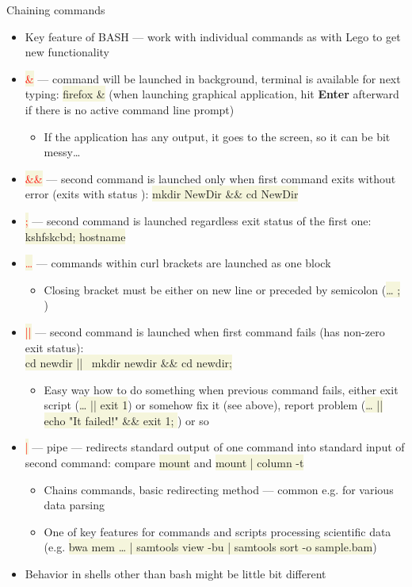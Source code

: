\documentclass[compress, ucs, xelatex, 11pt, xcolor=svgnames, aspectratio=169,
	hyperref={
		bookmarks=true,
		unicode=true,
		colorlinks=true,
		pdftitle={Linux, command line and MetaCentrum},
		plainpages=false,
		pdfauthor={Vojtech Zeisek},
		pdfsubject={Course about use of Linux command line, writing shell scripts and using MetaCentrum of CESNET},
		pdfcreator={XeLaTeX},
		pdfkeywords={Linux, GNU, BASH, shell, command line, MetaCentrum},
		linkcolor=DarkRed, %
		anchorcolor=DarkBlue, %
		citecolor=Indigo, %
		filecolor=NavyBlue, %
		menucolor=DarkMagenta, %
		urlcolor=DarkBlue, %
		pdftex},
	url={hyphens, lowtilde} %
	]{beamer}
\renewcommand{\texttt}[1]{\colorbox{Beige}{{\ttfamily #1}}}
\renewcommand{\alert}[1]{\textcolor{red}{#1}}
\begin{document}
\begin{frame}[allowframebreaks]{Chaining commands}
	\begin{itemize}
		\item Key feature of BASH --- work with individual commands as with Lego to get new functionality
		\item \alert{\texttt{\&}} --- command will be launched in background, terminal is available for next typing: \texttt{firefox \&} (when launching graphical application, hit \textbf{Enter} afterward if there is no active command line prompt)
		\begin{itemize}
			\item If the application has any output, it goes to the screen, so it can be bit messy\ldots
		\end{itemize}
		\item \alert{\texttt{\&\&}} --- second command is launched only when first command exits without error (exits with status \texttt{0}): \texttt{mkdir NewDir \&\& cd NewDir}
		\item \alert{\texttt{;}} --- second command is launched regardless exit status of the first one: \texttt{kshfskcbd; hostname}
		\item \alert{\texttt{\textbraceleft\ldots\textbraceright}} --- commands within curl brackets are launched as one block
		\begin{itemize}
			\item Closing bracket \texttt{\textbraceright} must be either on new line or preceded by semicolon (\texttt{\ldots{ }; \textbraceright})
		\end{itemize}
		\item \alert{\texttt{||}} --- second command is launched when first command fails (has non-zero exit status):\\\texttt{cd newdir || \textbraceleft~mkdir newdir \&\& cd newdir; \textbraceright}
		\begin{itemize}
			\item Easy way how to do something when previous command fails, either exit script (\texttt{\ldots{ }|| exit 1}) or somehow fix it (see above), report problem (\texttt{\ldots{ }|| \textbraceleft echo "It failed!" \&\& exit 1; \textbraceright}) or so
		\end{itemize}
		\item \alert{\texttt{|}} --- pipe --- redirects standard output of one command into standard input of second command: compare \texttt{mount} and \texttt{mount | column -t}
		\begin{itemize}
			\item Chains commands, basic redirecting method --- common e.g. for various data parsing
			\item One of key features for commands and scripts processing scientific data (e.g. \texttt{bwa mem \ldots{ }| samtools view -bu | samtools sort -o sample.bam})
		\end{itemize}
		\item Behavior in shells other than bash might be little bit different
	\end{itemize}
\end{frame}
\end{document}
